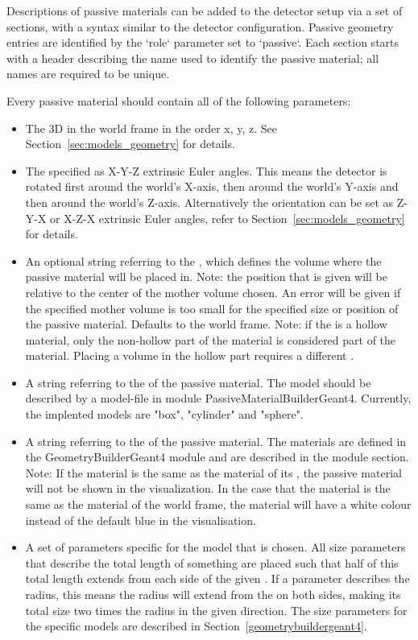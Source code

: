 Descriptions of passive materials can be added to the detector setup via a set of sections, with a syntax similar to the detector configuration.
Passive geometry entries are identified by the `role` parameter set to `passive`.
Each section starts with a header describing the name used to identify the passive material; all names are required to be unique.

Every passive material should contain all of the following parameters:
\begin{itemize}

  \item The 3D  in the world frame in the order x, y, z.
  See Section~\ref{sec:models_geometry} for details.
  \item The  specified as X-Y-Z extrinsic Euler angles.
  This means the detector is rotated first around the world's X-axis, then around the world's Y-axis and then around the world's Z-axis.
  Alternatively the orientation can be set as Z-Y-X or X-Z-X extrinsic Euler angles, refer to Section~\ref{sec:models_geometry} for details.
  \item An optional string referring to the , which defines the volume where the passive material will be placed in.
  Note: the position that is given will be relative to the center of the mother volume chosen. An error will be given if the specified mother volume is too small for the specified size or position of the passive material. Defaults to the world frame.
  Note: if the  is a hollow material, only the non-hollow part of the material is considered part of the material. Placing a volume in the hollow part requires a different .
  \item A string referring to the  of the passive material. 
  The model should be described by a model-file in module PassiveMaterialBuilderGeant4. Currently, the implented models are "box", "cylinder" and "sphere".
  \item A string referring to the  of the passive material. 
  The materials are defined in the GeometryBuilderGeant4 module and are described in the module section. 
  Note: If the material is the same as the material of its , the passive material will not be shown in the visualization. In the case that the material is the same as the material of the world frame, the material will have a white colour instead of the default blue in the visualisation.
  \item A set of  parameters specific for the model that is chosen. 
  All size parameters that describe the total length of something are placed such that half of this total length extends from each side of the given .
  If a parameter describes the radius, this means the radius will extend from the  on both sides, making its total size two times the radius in the given direction.
The size parameters for the specific models are described in Section~\ref{geometrybuildergeant4}.


\end{itemize}
